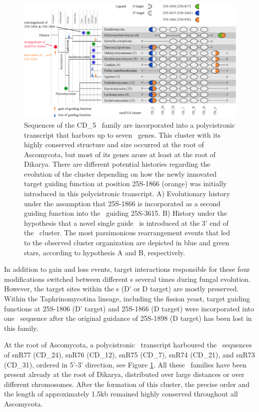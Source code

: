 \begin{figure}
  \centering
  \includegraphics[width=\textwidth]{pics/target_switches_CD_5_cluster.eps}
  \caption[Evolution of a \sno\ cluster harboring CD\_5
  sequences.]{Sequences of the CD\_5 \sno\ family are incorporated into a
    polycistronic transcript that harbors up to seven \sno\ genes. This
    cluster with its highly conserved structure and size occurred at the
    root of Ascomycota, but most of its genes arose at least at the root of
    Dikarya. There are different potential histories regarding the
    evolution of the cluster depending on how the newly innovated target
    guiding function at position 25S-1866 (orange) was initially introduced
    in this polycistronic transcript. A) Evolutionary history under the
    assumption that 25S-1866 is incorporated as a second guiding function
    into the \sno\ guiding 25S-3615. B) History under the hypothesis that a
    novel single guide \sno\ is introduced at the 3' end of the \sno\
    cluster. The most parsimonious rearrangement events that led to the
    observed cluster organization are depicted in blue and green stars,
    according to hypothesis A and B, respectively.}
\label{fig:CD_5_cluster_history}
\end{figure}

In addition to gain and loss events, target interactions responsible for
these four modifications switched between different \sno s several times
during fungal evolution. However, the target sites within the \sno s (D' or
D target) are mostly preserved. Within the Taphrinomycotina lineage,
including the fission yeast, target guiding functions at 25S-1806 (D'
target) and 25S-1866 (D target) were incorporated into one \sno\ sequence
after the original guidance of 25S-1898 (D target) has been lost in this family.

At the root of Ascomycota, a polycistronic \sno\ transcript harboured
the \sno\ sequences of snR77 (CD\_24), snR76 (CD\_12), snR75 (CD\_7), snR74
(CD\_21), and snR73 (CD\_31), ordered in 5'-3' direction, see Figure
\ref{fig:CD_5_cluster_history}.  All these \sno\ families have been
  present already at the root of Dikarya, distributed over large distances
or over different chromosomes. After the formation of this cluster,
the precise order and the length of approximately 1.5kb remained
highly conserved throughout all Ascomycota.

